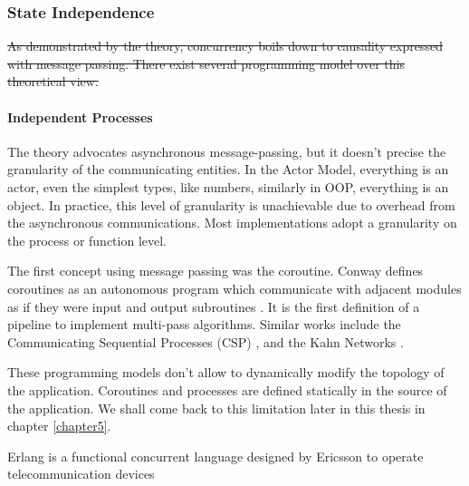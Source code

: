 \subsubsection{State Independence}


\sout{As demonstrated by the theory, concurrency boils down to causality expressed with message passing.
There exist several programming model over this theoretical view.}

\paragraph{Independent Processes}

The theory advocates asynchronous message-passing, but it doesn't precise the granularity of the communicating entities.
In the Actor Model, everything is an actor, even the simplest types, like numbers, similarly in OOP, everything is an object.
In practice, this level of granularity is unachievable due to overhead from the asynchronous communications.
Most implementations adopt a granularity on the process or function level.

The first concept using message passing was the coroutine.
Conway defines coroutines as an autonomous program which communicate with adjacent modules as if they were input and output subroutines \cite{Conway1963}.
It is the first definition of a pipeline to implement multi-pass algorithms.
Similar works include the Communicating Sequential Processes (CSP) \cite{Hoare1978, Brookes1984}, and the Kahn Networks \cite{Kahn1974, Kahn1976}.



These programming models don't allow to dynamically modify the topology of the application.
Coroutines and processes are defined statically in the source of the application.
We shall come back to this limitation later in this thesis in chapter \ref{chapter5}.

Erlang is a functional concurrent language designed by Ericsson to operate telecommunication devices \cite{JoeArmstrong,Nelson2004} %

